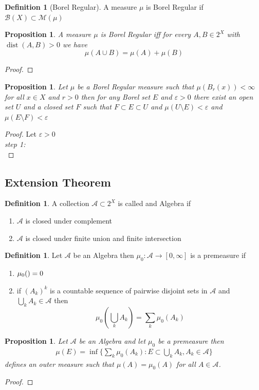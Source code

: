 \documentclass[11pt,a4paper]{article}
\newcommand{\cA}{\mathcal{A}}
\newcommand{\cB}{\mathcal{B}}
\newcommand{\cM}{\mathcal{M}}
\theoremstyle{plain}
\newtheorem{proposition}[theorem]{Proposition}
\theoremstyle{definition}
\newtheorem{definition}[theorem]{Definition}
\begin{document}
\begin{definition}[Borel Regular]
    A measure $\mu$ is Borel Regular if $\cB(X) \subset \cM(\mu)$
\end{definition}

\begin{proposition}
    A measure $\mu$ is Borel Regular iff for every $A, B \in 2^X$ with $\operatorname{dist}(A, B) > 0$
    we have 
    \[
        \mu(A \cup B) = \mu(A) + \mu(B)
    \]
\end{proposition}
\begin{proof}
\end{proof}

\begin{proposition}
    Let $\mu$ be a Borel Regular measure such that $\mu(B_r(x)) < \infty$ for all $x \in X$ and $r > 0$ then 
    for any Borel set $E$ and $\varepsilon > 0$ there exist an open set $U$ and a closed set $F$
    such that $F \subset E \subset U$ and $\mu(U \setminus E) < \varepsilon$ and $\mu(E \setminus F) < \varepsilon$
\end{proposition}
\begin{proof}
    Let $\varepsilon > 0$ \\
\textit{step 1:} \\
\end{proof}

\subsection{Extension Theorem}
\begin{definition}
    A collection $\cA \subset 2^X$ is called and Algebra if 
    \begin{enumerate}
        \item $\cA$ is closed under complement
        \item $\cA$ is closed under finite union and finite intersection
    \end{enumerate}
\end{definition}

\begin{definition}
    Let $\cA$ be an Algebra then $\mu_0: \cA \to [0, \infty]$ is a premeasure if
    \begin{enumerate}
        \item $\mu_0(\empty) = 0$
        \item if $(A_k)^k$ is a countable sequence of pairwise disjoint sets in $\cA$ and 
            $\bigcup_k A_k \in \cA$ then 
            \[
                \mu_0(\bigcup_k A_k) = \sum_k \mu_0(A_k)
            \]
    \end{enumerate}
\end{definition}

\begin{proposition}
    Let $\cA$ be an Algebra and let $\mu_0$ be a premeasure then 
    \begin{align*}
        \mu(E) = \inf \{ \sum_k \mu_0(A_k) : E \subset \bigcup_k A_k, A_k \in \cA \}
    \end{align*}
    defines an outer measure such that $\mu(A) = \mu_0(A)$ for all $A \in \cA$.
\end{proposition}
\begin{proof}
\end{proof}
\end{document}
